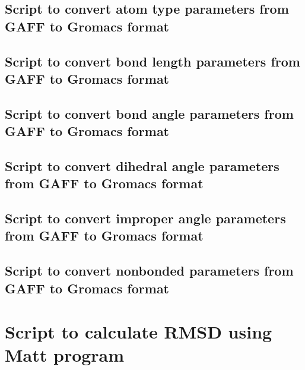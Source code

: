 \begin{singlespacing}
	\subsection{Script to convert atom type parameters from GAFF to Gromacs format}
	\label{sec:atomtype}
	

	\subsection{Script to convert bond length parameters from GAFF to Gromacs format}
	\label{sec:bondlength}
	
	
	\subsection{Script to convert bond angle parameters from GAFF to Gromacs format}
	\label{sec:bondangle}
		

	\subsection{Script to convert dihedral angle parameters from GAFF to Gromacs format}
	\label{sec:dihedral}
		

	\subsection{Script to convert improper angle parameters from GAFF to Gromacs format}
	\label{sec:improper}
	

	\subsection{Script to convert nonbonded parameters from GAFF to Gromacs format}
	\label{sec:improper}
		

\section{Script to calculate RMSD using Matt program}
\label{sec:rmsdMatt}
	
	
\end{singlespacing}
	